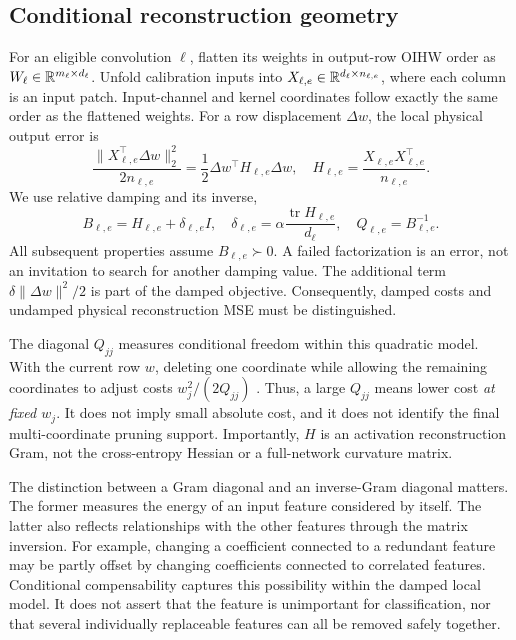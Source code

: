 \subsection{Conditional reconstruction geometry}
For an eligible convolution $\ell$, flatten its weights in output-row OIHW order as $W_\ell\in\mathbb{R}^{m_\ell\times d_\ell}$. Unfold calibration inputs into $X_{\ell,e}\in\mathbb{R}^{d_\ell\times n_{\ell,e}}$, where each column is an input patch. Input-channel and kernel coordinates follow exactly the same order as the flattened weights. For a row displacement $\Delta w$, the local physical output error is
\begin{equation}
 \frac{\|X_{\ell,e}^{\top}\Delta w\|_2^2}{2n_{\ell,e}}
 =\frac12\Delta w^\top H_{\ell,e}\Delta w,
 \quad H_{\ell,e}=\frac{X_{\ell,e}X_{\ell,e}^{\top}}{n_{\ell,e}}.
\end{equation}
We use relative damping and its inverse,
\begin{equation}
 B_{\ell,e}=H_{\ell,e}+\delta_{\ell,e}I,\quad
 \delta_{\ell,e}=\alpha\frac{\operatorname{tr}H_{\ell,e}}{d_\ell},\quad
 Q_{\ell,e}=B_{\ell,e}^{-1}.
 \label{eq:gram}
\end{equation}
All subsequent properties assume $B_{\ell,e}\succ0$. A failed factorization is an error, not an invitation to search for another damping value. The additional term $\delta\|\Delta w\|^2/2$ is part of the damped objective. Consequently, damped costs and undamped physical reconstruction MSE must be distinguished.

The diagonal $Q_{jj}$ measures conditional freedom within this quadratic model. With the current row $w$, deleting one coordinate while allowing the remaining coordinates to adjust costs $w_j^2/(2Q_{jj})$ \cite{obc}. Thus, a large $Q_{jj}$ means lower cost \emph{at fixed $w_j$}. It does not imply small absolute cost, and it does not identify the final multi-coordinate pruning support. Importantly, $H$ is an activation reconstruction Gram, not the cross-entropy Hessian or a full-network curvature matrix.

The distinction between a Gram diagonal and an inverse-Gram diagonal matters. The former measures the energy of an input feature considered by itself. The latter also reflects relationships with the other features through the matrix inversion. For example, changing a coefficient connected to a redundant feature may be partly offset by changing coefficients connected to correlated features. Conditional compensability captures this possibility within the damped local model. It does not assert that the feature is unimportant for classification, nor that several individually replaceable features can all be removed safely together.

